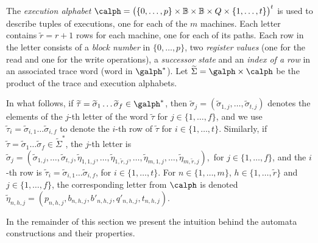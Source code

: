 The \emph{execution alphabet}
$\calph = \big(
\{0,\ldots,p\}\times {\mathbb B} \times {\mathbb B}
 \times
Q \times \{1,\ldots,t\}
\big)^t$
is used to describe tuples of executions, one for each of the $m$ machines. 
Each letter contains $\widetilde r = r+1$ rows for each machine, one for each of its paths. Each row in the letter consists of a \emph{block number} in $\{0,\ldots,p\}$, two \emph{register values} (one for the read and one for the write operations), a \emph{successor state} and an \emph{index of a row} in an associated trace word (word in $\galph^*$).
Let $\widetilde \Sigma =  \galph \times \calph$ be the product of the trace and execution alphabets.

In what follows, if $\widetilde \tau = \widetilde \sigma_1\ldots\widetilde\sigma_f \in \galph^*$, then 
$\widetilde \sigma_j = (\widetilde \sigma_{1,j},\ldots,\widetilde \sigma_{t,j})$ 
denotes the elements of the $j$-th letter of the word $\widetilde \tau$ for $j \in \{1,\ldots,f\}$, and we use
$\widetilde \tau_i  = \widetilde \sigma_{i,1}\ldots\widetilde\sigma_{i,f}$ 
to denote the $i$-th row of $\widetilde\tau$ for $i \in \{1,\ldots,t\}$.
Similarly, if $\widetilde \tau = \widetilde \sigma_1\ldots\widetilde\sigma_f \in {\widetilde \Sigma}^*$, 
the $j$-th letter is
$\widetilde \sigma_j = (\widetilde \sigma_{1,j},\ldots,\widetilde\sigma_{t,j},
\widetilde\eta_{1,1,j},\ldots,\widetilde\eta_{1,\widetilde r,j},\ldots,
\widetilde\eta_{m,1,j},\ldots,\widetilde\eta_{m,\widetilde r,j}),$
for $j \in \{1,\ldots,f\}$, 
and the $i$-th row is
$\widetilde \tau_i  = \widetilde \sigma_{i,1}\ldots\widetilde\sigma_{i,f}$,
for $i \in \{1,\ldots,t\}$.
For $n \in \{1,\ldots, m\}$, $h \in \{1,\ldots,\widetilde r\}$ and $j\in \{1,\ldots,f\}$,
the corresponding letter from $\calph$ is denoted
$\widetilde\eta_{n,h,j} = (p_{n,h,j},b_{n,h,j},b'_{n,h,j},q'_{n,h,j},t_{n,h,j})$.

In the remainder of this section we present the intuition behind the automata 
constructions and their properties.

